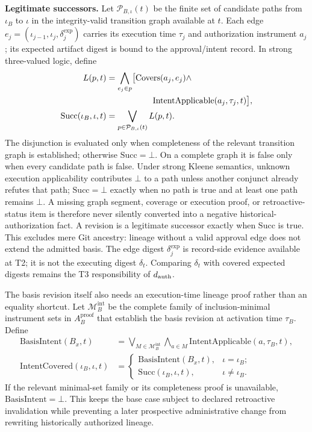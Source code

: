 \textbf{Legitimate successors.} Let
$\mathcal P_{B,\iota}(t)$ be the finite set of candidate paths from
$\iota_B$ to $\iota$ in the integrity-valid transition graph available at
$t$. Each edge $e_j=(\iota_{j-1},\iota_j,\delta_j^{\mathrm{exp}})$ carries its
execution time $\tau_j$ and authorization instrument $a_j$; its expected
artifact digest is bound to the approval/intent record. In strong
three-valued logic, define
\[
\begin{aligned}
L(p,t)&=\bigwedge_{e_j\in p}\bigl[\mathrm{Covers}(a_j,e_j)\land\\
&\hspace{5.5em}\mathrm{IntentApplicable}(a_j,\tau_j,t)\bigr],\\
\mathrm{Succ}(\iota_B,\iota,t)&=
  \bigvee_{p\in\mathcal P_{B,\iota}(t)}L(p,t).
\end{aligned}
\]
The disjunction is evaluated only when completeness of the relevant transition
graph is established; otherwise $\mathrm{Succ}=\bot$. On a complete graph it
is false only when every candidate path is false. Under strong Kleene
semantics, unknown execution applicability contributes $\bot$ to a path unless
another conjunct already refutes that path; $\mathrm{Succ}=\bot$ exactly when
no path is true and at least one path remains $\bot$. A missing graph segment,
coverage or execution proof, or retroactive-status item is therefore never
silently converted into a negative historical-authorization fact. A revision
is a legitimate successor exactly when $\mathrm{Succ}$ is true. This excludes mere Git
ancestry: lineage without a valid approval edge does not extend the admitted
basis. The edge digest $\delta_j^{\mathrm{exp}}$ is record-side evidence
available at T2; it is not the executing digest $\delta_t$. Comparing
$\delta_t$ with covered expected digests remains the T3 responsibility of
$d_{\mathrm{auth}}$.

The basis revision itself also needs an execution-time lineage proof rather
than an equality shortcut. Let $\mathcal M_B^{\mathrm{int}}$ be the complete
family of inclusion-minimal instrument sets in $A_B^{\mathrm{proof}}$ that
establish the basis revision at activation time $\tau_B$. Define
\[
\begin{aligned}
\mathrm{BasisIntent}(B_x,t)&=
 \bigvee_{M\in\mathcal M_B^{\mathrm{int}}}
 \bigwedge_{a\in M}\mathrm{IntentApplicable}(a,\tau_B,t),\\
\mathrm{IntentCovered}(\iota_B,\iota,t)&=
\begin{cases}
\mathrm{BasisIntent}(B_x,t),&\iota=\iota_B;\\
\mathrm{Succ}(\iota_B,\iota,t),&\iota\neq\iota_B.
\end{cases}
\end{aligned}
\]
If the relevant minimal-set family or its completeness proof is unavailable,
$\mathrm{BasisIntent}=\bot$. This keeps the base case subject to declared
retroactive invalidation while preventing a later prospective administrative
change from rewriting historically authorized lineage.

